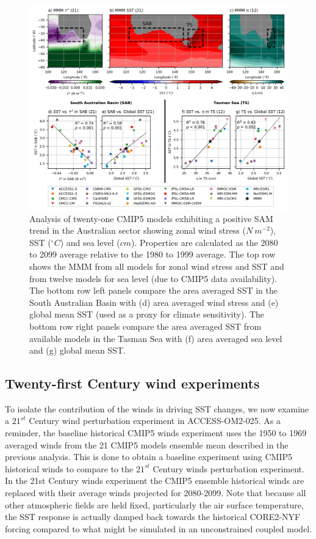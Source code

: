 \documentclass[draft,linenumbers]{agujournal2018}
\begin{document}
\begin{figure}[h]
\centering
\includegraphics[trim={0 0 0 0},clip, width=1\textwidth]{p26_fig2_.png}
\caption{Analysis of twenty-one CMIP5 models exhibiting a positive SAM trend in the Australian sector showing zonal wind stress ($N\ m^{-2}$), SST ($^{\circ}C$) and sea level ($cm$). Properties are calculated as the 2080 to 2099 average relative to the 1980 to 1999 average. The top row shows the MMM from all models for zonal wind stress and SST and from twelve models for sea level (due to CMIP5 data availability). The bottom row left panels compare the area averaged SST in the South Australian Basin with (d) area averaged wind stress and (e) global mean SST (used as a proxy for climate sensitivity). The bottom row right panels compare the area averaged SST from available models in the Tasman Sea with (f) area averaged sea level and (g) global mean SST.}\label{p26_fig1_}
\end{figure}


\subsection{Twenty-first Century wind experiments} \label{Twenty-first Century winds experiment}
To isolate the contribution of the winds in driving SST changes, we now examine a $21^{st}$ Century wind perturbation experiment in ACCESS-OM2-025. As a reminder, the baseline historical CMIP5 winds experiment uses the 1950 to 1969 averaged winds from the 21 CMIP5 models ensemble mean described in the previous analysis. This is done to obtain a baseline experiment using CMIP5 historical winds to compare to the $21^{st}$ Century winds perturbation experiment. In the 21st Century winds experiment the CMIP5 ensemble historical winds are replaced with their average winds projected for 2080-2099. Note that because all other atmospheric fields are held fixed, particularly the air surface temperature, the SST response is actually damped back towards the historical CORE2-NYF forcing compared to what might be simulated in an unconstrained coupled model.
\end{document}
